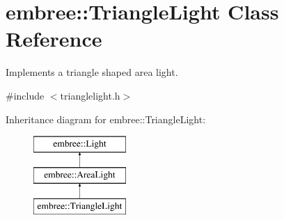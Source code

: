 \hypertarget{classembree_1_1_triangle_light}{
\section{embree::TriangleLight Class Reference}
\label{classembree_1_1_triangle_light}
}


Implements a triangle shaped area light.  




{\ttfamily \#include $<$trianglelight.h$>$}

Inheritance diagram for embree::TriangleLight:\begin{figure}[H]
\begin{center}
\leavevmode
\includegraphics[height=3.000000cm]{classembree_1_1_triangle_light}
\end{center}
\end{figure}
